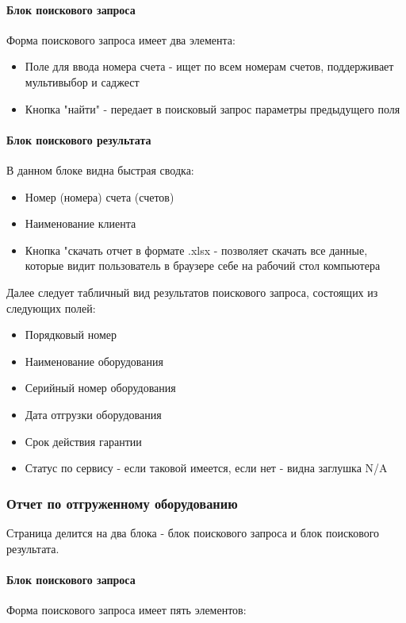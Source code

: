 \documentclass[DIV=calc, paper=a4, fontsize=11pt]{scrartcl} %
\begin{document}
\paragraph{Блок поискового запроса}
Форма поискового запроса имеет два элемента:

\begin{itemize}
	\item Поле для ввода номера счета - ищет по всем номерам счетов, поддерживает мультивыбор и саджест
	\item Кнопка "найти" - передает в поисковый запрос параметры предыдущего поля
\end{itemize}

\paragraph{Блок поискового результата}
В данном блоке видна быстрая сводка:

\begin{itemize}
	\item Номер (номера) счета (счетов)
	\item Наименование клиента
	\item Кнопка "скачать отчет в формате .xlsx - позволяет скачать все данные, которые видит пользователь в браузере себе на рабочий стол компьютера
\end{itemize}

Далее следует табличный вид результатов поискового запроса, состоящих из следующих полей:

\begin{itemize}
	\item Порядковый номер
	\item Наименование оборудования
	\item Серийный номер оборудования
	\item Дата отгрузки оборудования
	\item Срок действия гарантии
	\item Статус по сервису - если таковой имеется, если нет - видна заглушка N/A
\end{itemize}


\subsubsection{Отчет по отгруженному оборудованию}

Страница делится на два блока - блок поискового запроса и блок поискового результата.
\paragraph{Блок поискового запроса}
Форма поискового запроса имеет пять элементов:
\end{document}
